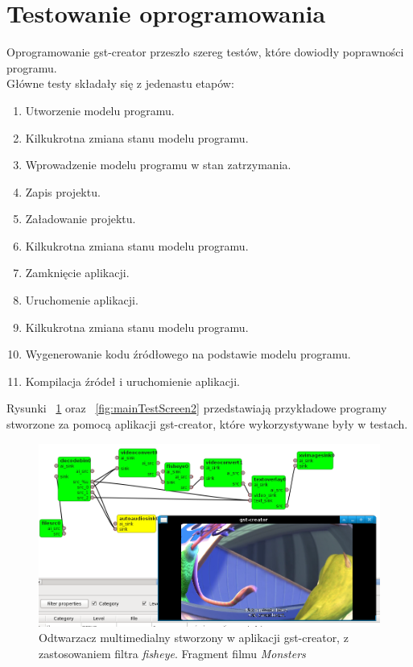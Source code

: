 \documentclass[12pt]{article}
\begin{document}
\section{Testowanie oprogramowania}
Oprogramowanie gst-creator przeszło szereg testów, które dowiodły poprawności programu.\\
Główne testy składały się z jedenastu etapów:
\begin{enumerate}
  \setlength{\itemsep}{0em}
\item Utworzenie modelu programu.
\item Kilkukrotna zmiana stanu modelu programu.
\item Wprowadzenie modelu programu w stan zatrzymania.
\item Zapis projektu.
\item Załadowanie projektu. 
\item Kilkukrotna zmiana stanu modelu programu.
\item Zamknięcie aplikacji.
\item Uruchomenie aplikacji.
\item Kilkukrotna zmiana stanu modelu programu.
\item Wygenerowanie kodu źródłowego na podstawie modelu programu.
\item Kompilacja źródeł i uruchomienie aplikacji.
\end{enumerate}
Rysunki ~\ref{fig:mainTestScreen1} oraz ~\ref{fig:mainTestScreen2} przedstawiają przykładowe programy stworzone za pomocą aplikacji gst-creator, które wykorzystywane były w testach.
\begin{figure}[H]
  \includegraphics[width=160mm]{img/main-test-screen1.png}
  \caption{Odtwarzacz multimedialny stworzony w aplikacji gst-creator, z zastosowaniem filtra \textit{fisheye}. Fragment filmu \textit{Monsters} \cite{monstersDownloadPage}}
  \label{fig:mainTestScreen1}
\end{figure}
\end{document}
